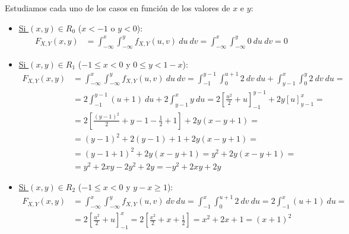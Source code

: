 \documentclass[12pt]{article}
\begin{document}
\begin{ejercicio}[5 puntos]
\begin{enumerate}
            Estudiamos cada uno de los casos en función de los valores de $x$ e $y$:
            \begin{itemize}
                \item \ul{Si $(x,y)\in R_0$} ($x<-1$ o $y<0$):
                \begin{align*}
                    F_{X,Y}(x,y) &= \int_{-\infty}^{x}\int_{-\infty}^{y} f_{X,Y}(u,v) \ du \ dv
                    = \int_{-\infty}^{x}\int_{-\infty}^{y} 0 \ du \ dv = 0
                \end{align*}

                \item \ul{Si $(x,y)\in R_1$} ($-1\leq x<0$ y $0\leq y<1-x$):
                \begin{align*}
                    F_{X,Y}(x,y) &= \int_{-\infty}^{x}\int_{-\infty}^{y} f_{X,Y}(u,v) \ du \ dv
                    = \int_{-1}^{y-1}\int_{0}^{u+1} 2 \ dv \ du + \int_{y-1}^{x}\int_{0}^{y} 2 \ dv \ du
                    =\\&= 2\int_{-1}^{y-1} (u+1) \ du + 2\int_{y-1}^{x} y \ du
                    = 2\left[\frac{u^2}{2}+u\right]_{-1}^{y-1} + 2y\left[u\right]_{y-1}^{x}
                    =\\&= 2\left[\frac{(y-1)^2}{2} + y-1-\frac{1}{2}+1\right] + 2y(x-y+1)
                    =\\&= (y-1)^2 + 2(y-1) + 1 + 2y(x-y+1)
                    =\\&= (y-1+1)^2 + 2y(x-y+1) = y^2 + 2y(x-y+1)
                    =\\&= y^2 + 2xy - 2y^2 + 2y
                    = -y^2 + 2xy + 2y
                \end{align*}

                \item \ul{Si $(x,y)\in R_2$} ($-1\leq x<0$ y $y-x\geq 1$):
                \begin{align*}
                    F_{X,Y}(x,y) &= \int_{-\infty}^{x}\int_{-\infty}^{y} f_{X,Y}(u,v) \ dv \ du
                    = \int_{-1}^{x}\int_{0}^{u+1} 2 \ dv \ du
                    = 2\int_{-1}^{x} (u+1) \ du
                    =\\&= 2\left[\frac{u^2}{2}+u\right]_{-1}^{x}
                    = 2\left[\frac{x^2}{2}+x+\frac{1}{2}\right]
                    = x^2 + 2x + 1 = (x+1)^2
                \end{align*}


\end{itemize}
\end{enumerate}
\end{ejercicio}
\end{document}
